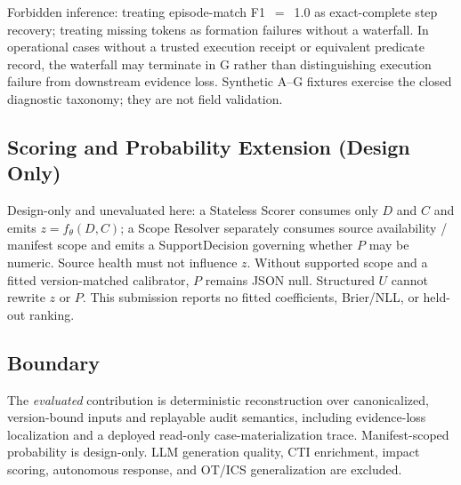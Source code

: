 Forbidden inference: treating episode-match F1~$=$~1.0 as exact-complete step recovery; treating
missing tokens as formation failures without a waterfall. In operational cases without a trusted
execution receipt or equivalent predicate record, the waterfall may terminate in G rather than
distinguishing execution failure from downstream evidence loss. Synthetic A--G fixtures exercise the
closed diagnostic taxonomy; they are not field validation.

\subsection{Scoring and Probability Extension (Design Only)}
\label{sec:calibration}

Design-only and unevaluated here: a Stateless Scorer consumes only $D$ and $C$ and emits
$z=f_{\theta}(D,C)$; a Scope Resolver separately consumes source availability / manifest scope and
emits a SupportDecision governing whether $P$ may be numeric. Source health must not influence $z$.
Without supported scope and a fitted version-matched calibrator, $P$ remains JSON null. Structured
$U$ cannot rewrite $z$ or $P$. This submission reports no fitted coefficients, Brier/NLL, or held-out
ranking.

\subsection{Boundary}
\label{sec:method-boundary}

The \emph{evaluated} contribution is deterministic reconstruction over canonicalized, version-bound
inputs and replayable audit semantics, including evidence-loss localization and a deployed read-only
case-materialization trace. Manifest-scoped probability is design-only. LLM generation quality, CTI
enrichment, impact scoring, autonomous response, and OT/ICS generalization are excluded.
